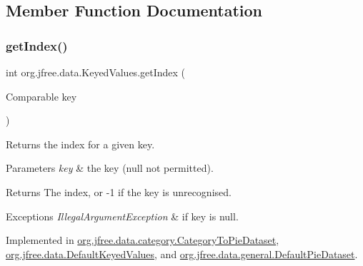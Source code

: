 \subsection{Member Function Documentation}
\mbox{\label{interfaceorg_1_1jfree_1_1data_1_1_keyed_values_ae360fa76e98655c84180651f8e1395d7}} 
\subsubsection{\texorpdfstring{get\+Index()}{getIndex()}}
{\footnotesize\ttfamily int org.\+jfree.\+data.\+Keyed\+Values.\+get\+Index (\begin{DoxyParamCaption}\item[{Comparable}]{key }\end{DoxyParamCaption})}

Returns the index for a given key.


\begin{DoxyParams}{Parameters}
{\em key} & the key ({\ttfamily null} not permitted).\\
\hline
\end{DoxyParams}
\begin{DoxyReturn}{Returns}
The index, or {\ttfamily -\/1} if the key is unrecognised.
\end{DoxyReturn}

\begin{DoxyExceptions}{Exceptions}
{\em Illegal\+Argument\+Exception} & if {\ttfamily key} is {\ttfamily null}. \\
\hline
\end{DoxyExceptions}


Implemented in \mbox{\hyperlink{classorg_1_1jfree_1_1data_1_1category_1_1_category_to_pie_dataset_a7a409f1cbb1cc8430652216156e3b7af}{org.\+jfree.\+data.\+category.\+Category\+To\+Pie\+Dataset}}, \mbox{\hyperlink{classorg_1_1jfree_1_1data_1_1_default_keyed_values_ac6e5a5ef8dc8c3c34e4aac48514d30d5}{org.\+jfree.\+data.\+Default\+Keyed\+Values}}, and \mbox{\hyperlink{classorg_1_1jfree_1_1data_1_1general_1_1_default_pie_dataset_a06709cd535587bc7fed697d3370b81b4}{org.\+jfree.\+data.\+general.\+Default\+Pie\+Dataset}}.

\mbox{\label{interfaceorg_1_1jfree_1_1data_1_1_keyed_values_a830386de8513342d99845bbd9cb57bc4}} 
